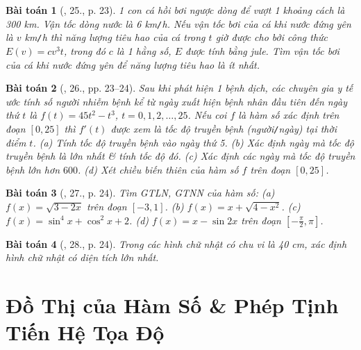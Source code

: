 \documentclass{article}
\newtheorem{baitoan}{Bài toán}
\begin{document}
\begin{baitoan}[\cite{SGK_Toan_12_giai_tich_nang_cao}, 25., p. 23]
	1 con cá hồi bơi ngược dòng để vượt 1 khoảng cách là {\rm300 km}. Vận tốc dòng nước là {\rm6 km{\tt/}h}. Nếu vận tốc bơi của cá khi nước đứng yên là $v$ {\rm km{\tt/}h} thì năng lượng tiêu hao của cá trong $t$ giờ được cho bởi công thức $E(v) = cv^3t$, trong đó $c$ là 1 hằng số, $E$ được tính bằng jule. Tìm vận tốc bơi của cá khi nước đứng yên để năng lượng tiêu hao là ít nhất.
\end{baitoan}

\begin{baitoan}[\cite{SGK_Toan_12_giai_tich_nang_cao}, 26., pp. 23--24]
	Sau khi phát hiện 1 bệnh dịch, các chuyên gia y tế ước tính số người nhiễm bệnh kể từ ngày xuất hiện bệnh nhân đầu tiên đến ngày thứ $t$ là $f(t) = 45t^2 - t^3$, $t = 0,1,2,\ldots,25$. Nếu coi $f$ là hàm số xác định trên đoạn $[0,25]$ thì $f'(t)$ được xem là tốc độ truyền bệnh (người{\tt/}ngày) tại thời điểm $t$. (a) Tính tốc độ truyền bệnh vào ngày thứ 5. (b) Xác định ngày mà tốc độ truyền bệnh là lớn nhất \& tính tốc độ đó. (c) Xác định các ngày mà tốc độ truyền bệnh lớn hơn $600$. (d) Xét chiều biến thiên của hàm số $f$ trên đoạn $[0,25]$.
\end{baitoan}

\begin{baitoan}[\cite{SGK_Toan_12_giai_tich_nang_cao}, 27., p. 24]
	Tìm {\rm GTLN, GTNN} của hàm số: (a) $f(x) = \sqrt{3 - 2x}$ trên đoạn $[-3,1]$. (b) $f(x) = x + \sqrt{4 - x^2}$. (c) $f(x) = \sin^4x + \cos^2x + 2$. (d) $f(x) = x - \sin2x$ trên đoạn $\left[-\frac{\pi}{2},\pi\right]$.
\end{baitoan}

\begin{baitoan}[\cite{SGK_Toan_12_giai_tich_nang_cao}, 28., p. 24]
	Trong các hình chữ nhật có chu vi là {\rm40 cm}, xác định hình chữ nhật có diện tích lớn nhất.
\end{baitoan}


\section{Đồ Thị của Hàm Số \& Phép Tịnh Tiến Hệ Tọa Độ}


\printbibliography[heading=bibintoc]
	
\end{document}

